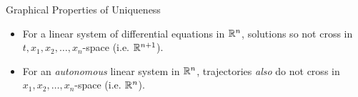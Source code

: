 \documentclass{beamer}
\begin{document}
\begin{frame}
\begin{block}{Graphical Properties of Uniqueness}
\begin{itemize}[<+- | alert@+>]
\item For a linear system of differential equations in $\mathbb{R}^n$, solutions so not cross in $t,x_1,x_2,\ldots,x_n$-space (i.e. $\mathbb{R}^{n+1}$).
\item For an \emph{autonomous} linear system in $\mathbb{R}^n$, trajectories \emph{also} do not cross in $x_1,x_2,\ldots,x_n$-space (i.e. $\mathbb{R}^n$).
\end{itemize}
\end{block}
\end{frame}
\end{document}
